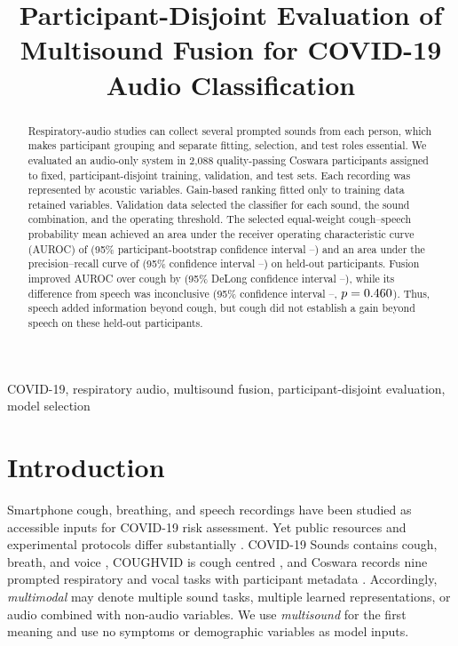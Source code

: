 \documentclass[conference]{IEEEtran}
\title{Participant-Disjoint Evaluation of Multisound Fusion for COVID-19 Audio Classification}
\author{
\IEEEauthorblockN{Nishant Harkut and Ritu Tiwari}
\IEEEauthorblockA{Department of Information Technology\\
Atal Bihari Vajpayee Indian Institute of Information Technology and Management\\
Gwalior, India}
}
\begin{document}
\maketitle

\begin{abstract}
Respiratory-audio studies can collect several prompted sounds from each person,
which makes participant grouping and separate fitting, selection, and test roles
essential. We evaluated an audio-only system in 2,088 quality-passing Coswara
participants assigned to fixed, participant-disjoint training, validation, and
test sets. Each recording was represented by \CandidateFeatureCount{} acoustic
variables. Gain-based ranking fitted only to training data retained
\SelectedFeatureCount{} variables. Validation data selected the classifier for
each sound, the sound combination, and the operating threshold. The selected
  equal-weight cough--speech probability mean achieved an area under the receiver
  operating characteristic curve (AUROC) of \FusionTestAUROC{} (95\% participant-bootstrap
confidence interval \FusionAUCILow{}--\FusionAUCIHigh{}) and an area under the
precision--recall curve of \FusionTestAUPRC{} (95\% confidence interval
\FusionAUPRCILow{}--\FusionAUPRCIHigh{}) on \FusionTestN{} held-out participants.
  Fusion improved AUROC over cough by \FusionMinusCoughAUROC{} (95\% DeLong confidence interval
\FusionMinusCoughAUCILow{}--\FusionMinusCoughAUCIHigh{}), while its
\FusionMinusSpeechAUROC{} difference from speech was inconclusive (95\%
confidence interval \FusionMinusSpeechAUCILow{}--\FusionMinusSpeechAUCIHigh{},
$p=0.460$). Thus, speech added information beyond cough,
but cough did not establish a gain beyond speech on these held-out participants.
\end{abstract}

\begin{IEEEkeywords}
COVID-19, respiratory audio, multisound fusion, participant-disjoint evaluation,
model selection
\end{IEEEkeywords}

\section{Introduction}

Smartphone cough, breathing, and speech recordings have been studied as
accessible inputs for COVID-19 risk assessment. Yet public resources and
experimental protocols differ substantially \cite{aleixandre2022review}.
COVID-19 Sounds contains cough, breath, and voice \cite{xia2021covid}, COUGHVID
is cough centred \cite{orlandic2021coughvid}, and Coswara records nine prompted
respiratory and vocal tasks with participant metadata
\cite{bhattacharya2023coswara}. Accordingly, \emph{multimodal} may denote
multiple sound tasks, multiple learned representations, or audio combined with
non-audio variables. We use \emph{multisound} for the first meaning and use no
symptoms or demographic variables as model inputs.
\end{document}
